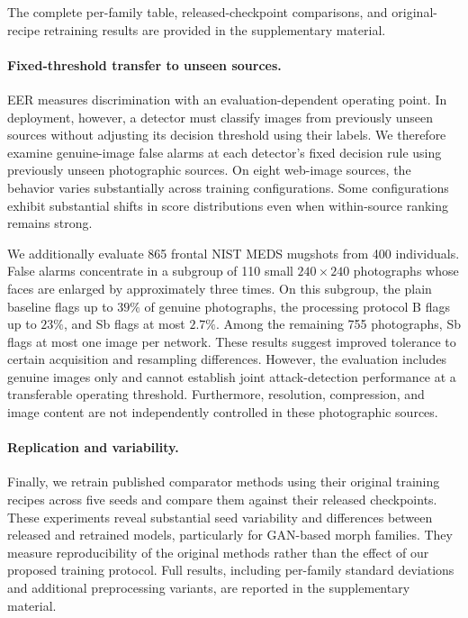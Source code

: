 The complete per-family table, released-checkpoint
comparisons, and original-recipe retraining results
are provided in the supplementary material.

\paragraph{Fixed-threshold transfer to unseen sources.}
EER measures discrimination with an evaluation-dependent
operating point. In deployment, however, a detector
must classify images from previously unseen sources
without adjusting its decision threshold using
their labels.
%
We therefore examine genuine-image false alarms
at each detector's fixed decision rule using
previously unseen photographic sources.
%
On eight web-image sources, the behavior varies
substantially across training configurations.
Some configurations exhibit substantial shifts
in score distributions even when within-source
ranking remains strong.

We additionally evaluate 865 frontal NIST MEDS
mugshots from 400 individuals.
False alarms concentrate in a subgroup of
110 small $240\times240$ photographs whose
faces are enlarged by approximately three times.
%
On this subgroup, the plain baseline flags up
to $39\%$ of genuine photographs, the processing
protocol B flags up to $23\%$, and Sb flags
at most $2.7\%$.
%
Among the remaining 755 photographs, Sb flags
at most one image per network.
%
These results suggest improved tolerance to
certain acquisition and resampling differences.
However, the evaluation includes genuine images
only and cannot establish joint attack-detection
performance at a transferable operating threshold.
Furthermore, resolution, compression, and image
content are not independently controlled
in these photographic sources.

\paragraph{Replication and variability.}
Finally, we retrain published comparator methods
using their original training recipes across
five seeds and compare them against their
released checkpoints. These experiments reveal substantial seed
variability and differences between released
and retrained models, particularly for GAN-based
morph families. They measure reproducibility
of the original methods rather than the effect
of our proposed training protocol. Full results, including per-family standard
deviations and additional preprocessing variants,
are reported in the supplementary material.

